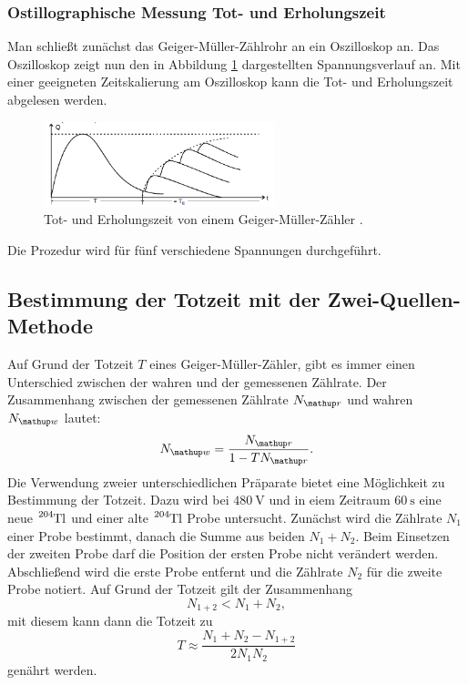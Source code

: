 \subsubsection{Ostillographische Messung Tot- und Erholungszeit}
Man schließt zunächst das Geiger-Müller-Zählrohr an ein
Oszilloskop an. Das Oszilloskop zeigt nun den in Abbildung \ref{fig: totzeit}
dargestellten Spannungsverlauf an. Mit einer geeigneten Zeitskalierung am Oszilloskop
kann die Tot- und Erholungszeit abgelesen werden.
\begin{figure}
  \centering
  \includegraphics[width=0.6\textwidth]{bilder/totzeit.png}
  \caption{Tot- und Erholungszeit von einem Geiger-Müller-Zähler \cite{anleitung703}.}
  \label{fig: totzeit}
  \end{figure}
Die Prozedur wird für fünf verschiedene Spannungen durchgeführt.

\subsection{Bestimmung der Totzeit mit der Zwei-Quellen-Methode}
Auf Grund der Totzeit $T$ eines Geiger-Müller-Zähler, gibt es immer einen
Unterschied zwischen der wahren und der gemessenen Zählrate.
Der Zusammenhang zwischen der gemessenen Zählrate $N\ua{r}$ und
wahren $N\ua{w}$ lautet:
\begin{equation}
  \label{eq:wahre_zaehlrate}
  N\ua{w}=\frac{N\ua{r}}{1-TN\ua{r}}.
\end{equation}
Die Verwendung zweier unterschiedlichen Präparate bietet eine Möglichkeit zu
Bestimmung der Totzeit. Dazu wird bei $\SI{480}{\volt}$ und in eiem Zeitraum $\SI{60}{\second}$ eine neue
$\ce{^{204}Tl}$ und einer alte $\ce{^{204}Tl}$ Probe untersucht.
Zunächst wird die Zählrate  $N_1$ einer Probe bestimmt, danach die
Summe aus beiden $N_1+N_2$. Beim Einsetzen der zweiten Probe darf die Position der
ersten Probe nicht verändert werden.
Abschließend wird die erste Probe entfernt und die Zählrate $N_2$ für die zweite
Probe notiert.
Auf Grund der Totzeit gilt der Zusammenhang
\begin{equation}
  \label{eq:totzeit_summe}
  N_{1+2}<N_1+N_2,
\end{equation}
mit diesem kann dann die Totzeit zu
\begin{equation}
  \label{eq:totzeit}
  T\approx \frac{N_1+N_2-N_{1+2}}{2N_1N_2}
\end{equation}
genährt werden.


